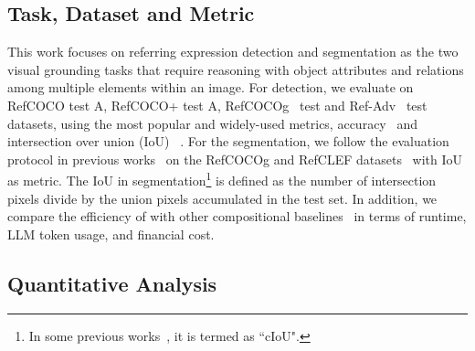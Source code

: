 \subsection{Task, Dataset and Metric}
This work focuses on referring expression detection and segmentation as the two visual grounding tasks that require reasoning with object attributes and relations among multiple elements within an image.  For detection, we evaluate on RefCOCO test A, RefCOCO+ test A, RefCOCOg~\cite{kazemzadeh_referitgame_2014} test and Ref-Adv~\cite{akula_words_2020} test datasets, using the most popular and widely-used metrics, \ie accuracy~\cite{li_grounded_2022,liu_grounding_2023,dai_simvg_2024,xiao_florence-2_2024} and intersection over union (IoU)~\cite{suris_vipergpt_2023, ke_hydra_2024} . For the segmentation, we follow the evaluation protocol in previous works~\cite{rasheed_glamm_2024, zhang_psalm_2024} on the RefCOCOg and RefCLEF datasets~\cite{kazemzadeh_referitgame_2014} with IoU as metric. The IoU in segmentation\footnote{In some previous works~\cite{lai_lisa_2024, zhang_psalm_2024, rasheed_glamm_2024}, it is termed as ``cIoU".} is defined as the number of intersection pixels divide by the union pixels accumulated in the test set. In addition, we compare the efficiency of \methodname{} with other compositional baselines~\cite{ke_hydra_2024, suris_vipergpt_2023} in terms of runtime, LLM token usage, and financial cost.

\subsection{Quantitative Analysis}
\label{sec:quantitative}

